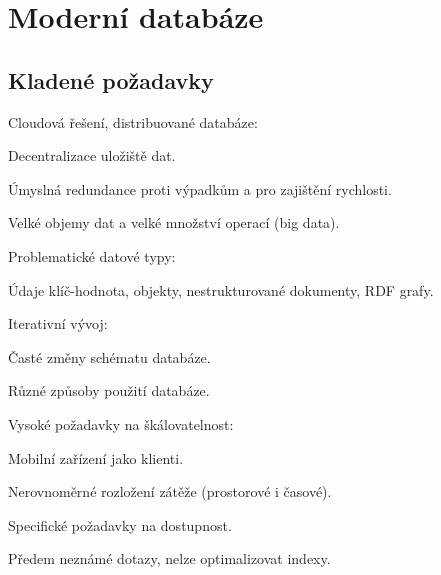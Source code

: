 
\section{Moderní databáze}

\subsection{Kladené požadavky}

\begin{compactitem}
    \item Cloudová řešení, distribuované databáze: \begin{compactitem}
        \item Decentralizace uložiště dat.
        \item Úmyslná redundance proti výpadkům a pro zajištění rychlosti.
        \item Velké objemy dat a velké množství operací (big data).
    \end{compactitem}

    \item Problematické datové typy: \begin{compactitem}
        \item Údaje klíč-hodnota, objekty, nestrukturované dokumenty, RDF grafy.
    \end{compactitem}

    \item Iterativní vývoj: \begin{compactitem}
        \item Časté změny schématu databáze.
        \item Různé způsoby použití databáze.
    \end{compactitem}

    \item Vysoké požadavky na škálovatelnost: \begin{compactitem}
        \item Mobilní zařízení jako klienti.
        \item Nerovnoměrné rozložení zátěže (prostorové i časové).
        \item Specifické požadavky na dostupnost.
        \item Předem neznámé dotazy, nelze optimalizovat indexy.
    \end{compactitem}
\end{compactitem}

